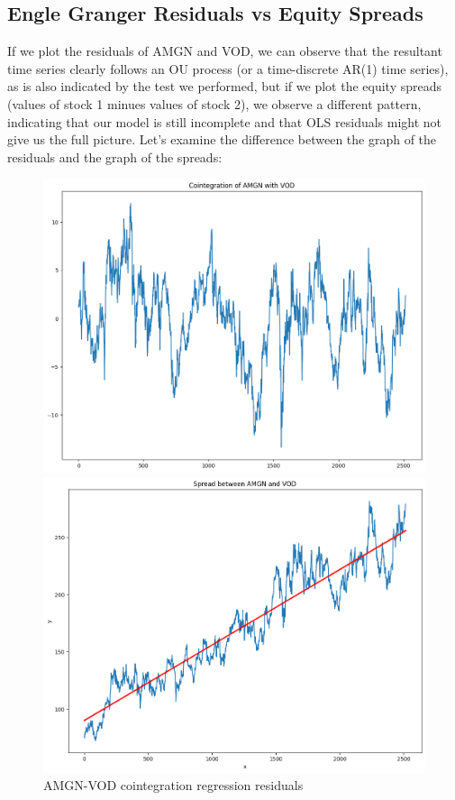 \documentclass{article}
\begin{document}
\begin{spacing}{2.0}
\subsection{Engle Granger Residuals vs Equity Spreads}

If we plot the residuals of AMGN and VOD, we can observe that the resultant time series clearly follows an OU process (or a time-discrete AR(1) time series), as is also indicated
by the test we performed, but if we plot the equity spreads (values of stock 1 minues values of stock 2), we observe a different pattern, indicating that our model is still incomplete
and that OLS residuals might not give us the full picture. Let's examine the difference between the graph of the residuals and the graph of the spreads:

\begin{figure}[H]
    \centering
    \begin{minipage}{0.48\textwidth}
        \centering
        \includegraphics[width=\textwidth]{./images/amgn_vod_cointegration.png}
        \caption{AMGN-VOD cointegration regression residuals}
    \end{minipage}
    \hfill
    \begin{minipage}{0.48\textwidth}
        \centering
        \includegraphics[width=\textwidth]{./images/spread_amgn_vod.png}

\end{minipage}
\end{figure}
\end{spacing}
\end{document}
